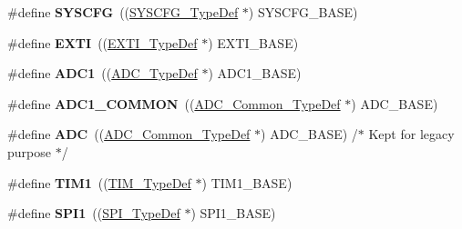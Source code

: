 \begin{DoxyCompactItemize}
\item 
\mbox{\label{group___peripheral__declaration_ga3c833fe1c486cb62250ccbca32899cb8}} 
\#define {\bfseries S\+Y\+S\+C\+FG}~((\hyperlink{struct_s_y_s_c_f_g___type_def}{S\+Y\+S\+C\+F\+G\+\_\+\+Type\+Def} $\ast$) S\+Y\+S\+C\+F\+G\+\_\+\+B\+A\+SE)
\item 
\mbox{\label{group___peripheral__declaration_ga9189e770cd9b63dadd36683eb9843cac}} 
\#define {\bfseries E\+X\+TI}~((\hyperlink{struct_e_x_t_i___type_def}{E\+X\+T\+I\+\_\+\+Type\+Def} $\ast$) E\+X\+T\+I\+\_\+\+B\+A\+SE)
\item 
\mbox{\label{group___peripheral__declaration_ga90d2d5c526ce5c0a551f533eccbee71a}} 
\#define {\bfseries A\+D\+C1}~((\hyperlink{struct_a_d_c___type_def}{A\+D\+C\+\_\+\+Type\+Def} $\ast$) A\+D\+C1\+\_\+\+B\+A\+SE)
\item 
\mbox{\label{group___peripheral__declaration_gaf1919c64fc774aab31190346fd5457e2}} 
\#define {\bfseries A\+D\+C1\+\_\+\+C\+O\+M\+M\+ON}~((\hyperlink{struct_a_d_c___common___type_def}{A\+D\+C\+\_\+\+Common\+\_\+\+Type\+Def} $\ast$) A\+D\+C\+\_\+\+B\+A\+SE)
\item 
\mbox{\label{group___peripheral__declaration_ga54d148b91f3d356713f7e367a2243bea}} 
\#define {\bfseries A\+DC}~((\hyperlink{struct_a_d_c___common___type_def}{A\+D\+C\+\_\+\+Common\+\_\+\+Type\+Def} $\ast$) A\+D\+C\+\_\+\+B\+A\+SE) /$\ast$ Kept for legacy purpose $\ast$/
\item 
\mbox{\label{group___peripheral__declaration_ga2e87451fea8dc9380056d3cfc5ed81fb}} 
\#define {\bfseries T\+I\+M1}~((\hyperlink{struct_t_i_m___type_def}{T\+I\+M\+\_\+\+Type\+Def} $\ast$) T\+I\+M1\+\_\+\+B\+A\+SE)
\item 
\mbox{\label{group___peripheral__declaration_gad483be344a28ac800be8f03654a9612f}} 
\#define {\bfseries S\+P\+I1}~((\hyperlink{struct_s_p_i___type_def}{S\+P\+I\+\_\+\+Type\+Def} $\ast$) S\+P\+I1\+\_\+\+B\+A\+SE)
\item 
\mbox{\label{group___peripheral__declaration_gaf2c3d8ce359dcfbb2261e07ed42af72b}} 

\end{DoxyCompactItemize}
